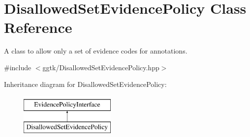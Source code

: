 \hypertarget{classDisallowedSetEvidencePolicy}{}\section{Disallowed\+Set\+Evidence\+Policy Class Reference}
\label{classDisallowedSetEvidencePolicy}


A class to allow only a set of evidence codes for annotations.  




{\ttfamily \#include $<$ggtk/\+Disallowed\+Set\+Evidence\+Policy.\+hpp$>$}

Inheritance diagram for Disallowed\+Set\+Evidence\+Policy\+:\begin{figure}[H]
\begin{center}
\leavevmode
\includegraphics[height=2.000000cm]{classDisallowedSetEvidencePolicy}
\end{center}
\end{figure}
